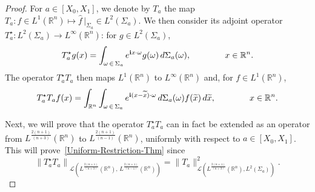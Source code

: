 \documentclass[AHL,Unicode,longabstracts]{cedram}
\newcommand{\scL}{\mathscr{L}}
\newcommand*\R{\mathbb{R}}
\renewcommand{\i}{\mathbf{i}}
\renewcommand{\tilde}{\widetilde}
\let\oldtilde\tilde
\renewcommand*{\tilde}[1]{\mathchoice{\widetilde{#1}}{\widetilde{#1}}{\oldtilde{#1}}{\oldtilde{#1}}}
\begin{document}
\begin{proof}
For $a \in [X_0, X_1]$, we denote by $T_{a}$ the map $T_{a} : f \in L^{1}(\R^n) \mapsto \widehat f \,|_{\Sigma_{a}} \in L^2(\Sigma_{a})$. We then consider its adjoint operator $T_{a}^\star : L^2(\Sigma_{a}) \to L^\infty(\R^n)$: for $g \in L^2(\Sigma_{a})$,
\begin{equation*}
T^\star_{a} g(x)
\\
=
\int_{{\omega}\, \in\,\Sigma_{a} } e^{\i x \cdot {\omega}} g({\omega}) \, d \Sigma_{a}({\omega}),
\qquad \qquad x\in \R^{n}.
\end{equation*}
The operator $T^\star_{a}T_{a}$ then maps $L^1(\R^n)$ to $L^\infty(\R^n)$ and, for $f \in L^1(\R^n)$,
\begin{equation}\label{Def-T-star-T}
T^\star_{a} T_{a} f(x) =
\int_{\R^{n}}
\int_{{\omega}\, \in\,\Sigma_{a} } e^{\i (x-\tilde{x}) \cdot {\omega}}
\, d \Sigma_{a}({\omega}) f(\tilde{x})
\, d \tilde{x},
\qquad \qquad x \in \R^n.
\end{equation}

Next, we will prove that the operator $ T^\star _{a}T_{a}$ can in fact be extended as an operator from $L^{\frac{2(n+1)}{(n+3)}}(\R^n)$ to $L^{\frac{2(n+1)}{(n-1)}}(\R^n)$, uniformly with respect to $a \in [X_0, X_1]$. This will prove~\eqref{Uniform-Restriction-Thm} since
\[
\left\| T^\star _{a}T_{a}\right\|_{\scL\left(L^{\frac{2(n+1)}{(n+3)}}(\R^n),\, L^{\frac{2(n+1)}{(n-1)}}(\R^n)\right)} =
\| T_a \|_{\scL\left(L^{\frac{2(n+1)}{(n+3)}}(\R^n), L^{2}(\Sigma_a)\right)}^2.
\]


\end{proof}
\end{document}
